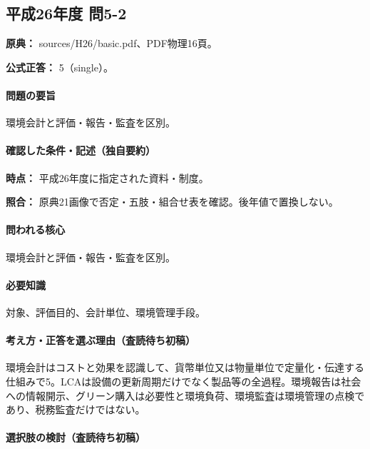 \subsection{平成26年度 問5-2}
\label{q:h26-reg-basic-5-2}

\noindent\textbf{原典：} sources/H26/basic.pdf、PDF物理16頁。

\textbf{公式正答：} 5（single）。

\paragraph{問題の要旨} 環境会計と評価・報告・監査を区別。

\paragraph{確認した条件・記述（独自要約）}\mbox{}\par

\noindent\textbf{時点：} 平成26年度に指定された資料・制度。\par

\noindent\textbf{照合：} 原典21画像で否定・五肢・組合せ表を確認。後年値で置換しない。\par

\paragraph{問われる核心} 環境会計と評価・報告・監査を区別。

\paragraph{必要知識} 対象、評価目的、会計単位、環境管理手段。

\paragraph{考え方・正答を選ぶ理由（査読待ち初稿）} 環境会計はコストと効果を認識して、貨幣単位又は物量単位で定量化・伝達する仕組みで5。LCAは設備の更新周期だけでなく製品等の全過程。環境報告は社会への情報開示、グリーン購入は必要性と環境負荷、環境監査は環境管理の点検であり、税務監査だけではない。

\paragraph{選択肢の検討（査読待ち初稿）}\mbox{}\par

